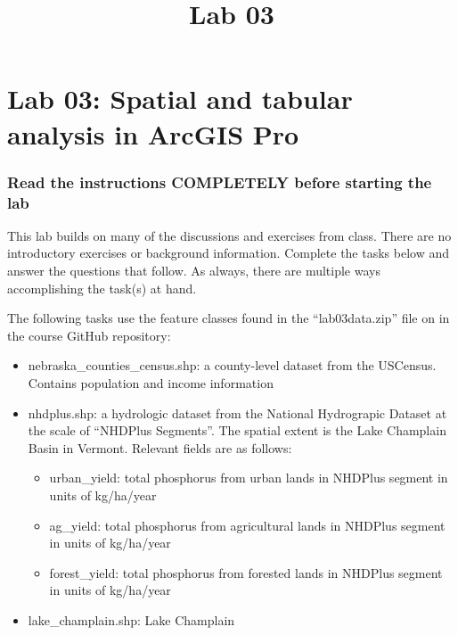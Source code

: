 \documentclass[]{article}
\title{Lab 03}
\author{}
\date{}
\makeatletter
\providecommand{\tightlist}{%
  \setlength{\itemsep}{0pt}\setlength{\parskip}{0pt}}
\renewcommand{\maketitle}{\bgroup\vspace*{-1cm}\setlength{\parindent}{0pt}
\begin{flushleft}
  \@author
  
  \@date
  
\end{flushleft}\egroup
}
\makeatother
\begin{document}
\maketitle

\hypertarget{lab-03-spatial-and-tabular-analysis-in-arcgis-pro}{%
\section{Lab 03: Spatial and tabular analysis in ArcGIS
Pro}\label{lab-03-spatial-and-tabular-analysis-in-arcgis-pro}}

\hypertarget{read-the-instructions-completely-before-starting-the-lab}{%
\subsubsection{Read the instructions COMPLETELY before starting the
lab}\label{read-the-instructions-completely-before-starting-the-lab}}

This lab builds on many of the discussions and exercises from class.
There are no introductory exercises or background information. Complete
the tasks below and answer the questions that follow. As always, there
are multiple ways accomplishing the task(s) at hand.

The following tasks use the feature classes found in the
``lab03data.zip'' file on in the course GitHub repository:

\begin{itemize}
\tightlist
\item
  nebraska\_counties\_census.shp: a county-level dataset from the
  USCensus. Contains population and income information
\item
  nhdplus.shp: a hydrologic dataset from the National Hydrograpic
  Dataset at the scale of ``NHDPlus Segments''. The spatial extent is
  the Lake Champlain Basin in Vermont. Relevant fields are as follows:

  \begin{itemize}
  \tightlist
  \item
    urban\_yield: total phosphorus from urban lands in NHDPlus segment
    in units of kg/ha/year
  \item
    ag\_yield: total phosphorus from agricultural lands in NHDPlus
    segment in units of kg/ha/year
  \item
    forest\_yield: total phosphorus from forested lands in NHDPlus
    segment in units of kg/ha/year
  \end{itemize}
\item
  lake\_champlain.shp: Lake Champlain
\end{itemize}
\end{document}
